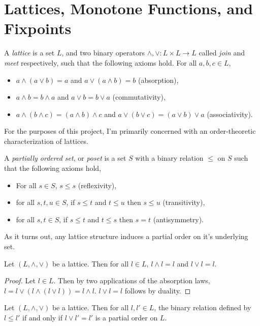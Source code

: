 \section{Lattices, Monotone Functions, and Fixpoints}
\begin{definition}[Lattice]\label{latedef}
  A \emph{lattice} is a set $L$, and two binary operators $\wedge, \vee : L \times L \to L$ called \emph{join} and \emph{meet} respectively,
  such that the following axioms hold. For all $a, b, c \in L$,
  \begin{itemize}
    \item $a \wedge (a \vee b) = a$ and $a \vee (a \wedge b) = b$ (absorption),
    \item $a \wedge b = b \wedge a$ and $a \vee b = b \vee a$ (commutativity),
    \item $a \wedge (b \wedge c) = (a \wedge b) \wedge c$ and $a \vee (b \vee c) = (a \vee b) \vee a$ (associativity).
  \end{itemize}
\end{definition}
For the purposes of this project, I'm primarily concerned with an order-theoretic characterization of lattices. 
\begin{definition}[Poset]\label{posetdef}
  A \emph{partially ordered set}, or \emph{poset} is a set $S$ with a binary relation $\leq$ on $S$ such that the following axioms hold,
  \begin{itemize}
    \item For all $s \in S$, $s \leq s$ (reflexivity),
    \item for all $s, t, u \in S$, if $s \leq t$ and $t \leq u$ then $s \leq u$ (transitivity),
    \item for all $s, t \in S$, if $s \leq t$ and $t \leq s$ then $s = t$ (antisymmetry).
  \end{itemize}
\end{definition}
As it turns out, any lattice structure induces a partial order on it's underlying set.
\begin{lemma}\label{joinMeetIdempotent}
  Let $(L, \wedge, \vee)$ be a lattice. Then for all $l \in L$, $l \wedge l = l$ and $l \vee l = l$.
\end{lemma}
\begin{proof}
  Let $l \in L$. Then by two applications of the absorption laws, $l = l \vee (l \wedge (l \vee l)) = l \wedge l$. $l \vee l = l$ follows
  by duality.
\end{proof}
\begin{prop}\label{latOrd}
  Let $(L, \wedge, \vee)$ be a lattice. Then for all $l, l' \in L$, the binary relation defined by $l \leq l'$ if and only if $l \vee l' = l'$
  is a partial order on $L$.
\end{prop}
